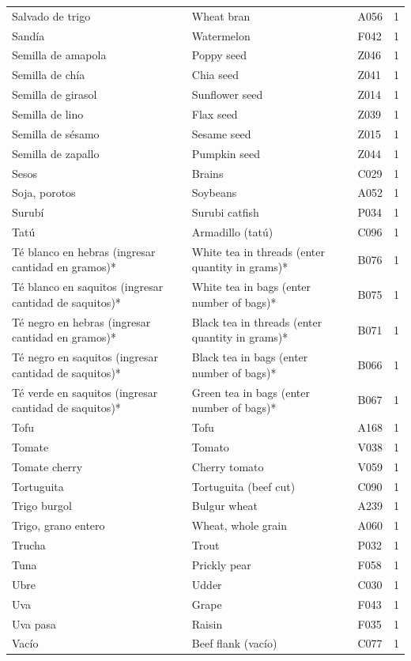 {\begin{longtable}{p{4.3cm}p{5.5cm}p{1.5cm}p{0.7cm}}
Salvado de trigo & Wheat bran & A056 & 1\\
Sandía & Watermelon & F042 & 1\\
Semilla de amapola & Poppy seed & Z046 & 1\\
Semilla de chía & Chia seed & Z041 & 1\\
Semilla de girasol & Sunflower seed & Z014 & 1\\
Semilla de lino & Flax seed & Z039 & 1\\
Semilla de sésamo & Sesame seed & Z015 & 1\\
Semilla de zapallo & Pumpkin seed & Z044 & 1\\
Sesos & Brains & C029 & 1\\
Soja, porotos & Soybeans & A052 & 1\\
Surubí & Surubi catfish & P034 & 1\\
Tatú & Armadillo (tatú) & C096 & 1\\
Té blanco en hebras (ingresar cantidad en gramos)* & White tea in threads (enter quantity in grams)* & B076 & 1\\
Té blanco en saquitos (ingresar cantidad de saquitos)* & White tea in bags (enter number of bags)* & B075 & 1\\
Té negro en hebras (ingresar cantidad en gramos)* & Black tea in threads (enter quantity in grams)* & B071 & 1\\
Té negro en saquitos (ingresar cantidad de saquitos)* & Black tea in bags (enter number of bags)* & B066 & 1\\
Té verde en saquitos (ingresar cantidad de saquitos)* & Green tea in bags (enter number of bags)* & B067 & 1\\
Tofu & Tofu & A168 & 1\\
Tomate & Tomato & V038 & 1\\
Tomate cherry & Cherry tomato & V059 & 1\\
Tortuguita & Tortuguita (beef cut) & C090 & 1\\
Trigo burgol & Bulgur wheat & A239 & 1\\
Trigo, grano entero & Wheat, whole grain & A060 & 1\\
Trucha & Trout & P032 & 1\\
Tuna & Prickly pear & F058 & 1\\
Ubre & Udder & C030 & 1\\
Uva & Grape & F043 & 1\\
Uva pasa & Raisin & F035 & 1\\
Vacío & Beef flank (vacío) & C077 & 1\\

\end{longtable}}
